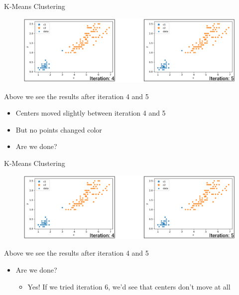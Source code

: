 \documentclass[aspectratio=169]{../latex_main/tntbeamer}  %
\begin{document}
	
	\begin{frame}{K-Means Clustering}
	    \begin{figure}
	        \centering
	        \includegraphics[scale=.38]{Bild19}
	    \end{figure}
	    Above we see the results after iteration 4 and 5
	    \begin{itemize}
	        \item Centers moved slightly between iteration 4 and 5
	        \item But no points changed color
	        \item Are we done?
	    \end{itemize}
	\end{frame}
	
	
	\begin{frame}{K-Means Clustering}
	    \begin{figure}
	        \centering
	        \includegraphics[scale=.38]{Bild19}
	    \end{figure}
	    Above we see the results after iteration 4 and 5
	    \begin{itemize}
	        \item Are we done?
	        \begin{itemize}
	            \item Yes! If we tried iteration 6, we’d see that centers don’t move at all
	        \end{itemize}
	    \end{itemize}
	\end{frame}
	
	
	
\end{document}
